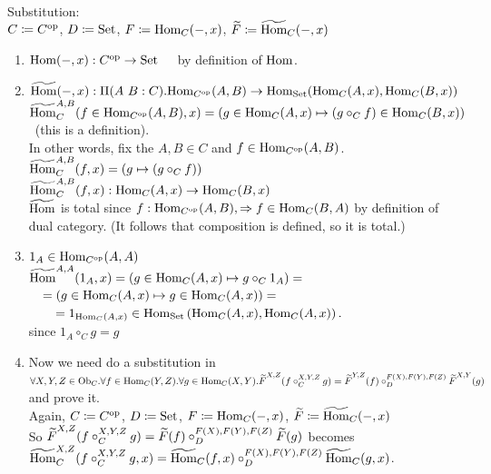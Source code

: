 \documentclass[10pt,a4paper]{article}
\begin{document}
\myprf\\
Substitution:\\
$C \coloneqq C^{\textrm{op}}$, 
$D \coloneqq {\textrm{Set}}$, 
$F \coloneqq {\textrm{Hom}}_C(-,x)$, 
${\widetilde{F}\textrm{}} \coloneqq {\widetilde{{\textrm{Hom}}}\textrm{}}_C(-,x)$\\
\begin{enumerate}
\item ${\textrm{Hom}}(-, x) : C^{\textrm{op}} \to {\textrm{Set}}$\ \ \ by definition of ${\textrm{Hom}}$.
\item $\HomMor(-, x) :\Pi(A\ B:C).\Hom_{C^\op}(A,B) \to \Hom_\Set(\Hom_C(A,x), \Hom_C(B,x))$\\
${\widetilde{{\textrm{Hom}}}\textrm{}}_C^{A,B}(f\in{\textrm{Hom}}_{C^{\textrm{op}}}(A,B), x) = (g \in{\textrm{Hom}}_C(A,x) \mapsto (g \circ_C f) \in{\textrm{Hom}}_C(B,x))$\ (this is a definition).\\
In other words, fix the $A,B\in C$ and $f\in{\textrm{Hom}}_{C^{\textrm{op}}}(A,B)$.\\
${\widetilde{{\textrm{Hom}}}\textrm{}}_C^{A,B}(f, x) = (g\mapsto (g \circ_C f))$\\
${\widetilde{{\textrm{Hom}}}\textrm{}}_C^{A,B}(f, x) : {\textrm{Hom}}_C(A,x) \to {\textrm{Hom}}_C(B,x)$
\\
${\widetilde{{\textrm{Hom}}}\textrm{}}$ is total since $f:{\textrm{Hom}}_{C^{\textrm{op}}}(A,B), \Rightarrow f\in{\textrm{Hom}}_C(B,A)$ by definition of dual category. (It follows that composition is defined, so it is total.)
\item $1_A\in{\textrm{Hom}}_{C^{\textrm{op}}}(A,A)$\\
${\widetilde{{\textrm{Hom}}}\textrm{}}^{A,A}(1_A, x) = \left(g \in{\textrm{Hom}}_C(A,x)\mapsto g \circ_C 1_A\right) = $\\
$\quad = \left(g \in{\textrm{Hom}}_C(A,x) \mapsto g \in{\textrm{Hom}}_C(A,x)\right) =$\\
$\quad \quad = 1_{{\textrm{Hom}}_C(A,x)} \in {\textrm{Hom}}_{\textrm{Set}}\left({\textrm{Hom}}_C(A,x), {\textrm{Hom}}_C(A,x)\right).$\\
since $1_A \circ_C g = g$\\
\item Now we need do a substitution in
$\forall X,Y,Z \in {\textrm{Ob}}_C.\forall f\in{\textrm{Hom}}_C(Y,Z).\forall g\in{\textrm{Hom}}_C(X,Y). {\widetilde{F}\textrm{}}^{X,Z}(f\circ_C^{X,Y,Z} g)={\widetilde{F}\textrm{}}^{Y,Z}(f)\circ_D^{F(X),F(Y),F(Z)} {\widetilde{F}\textrm{}}^{X,Y}(g)$ and prove it.\\
Again, $C \coloneqq C^{\textrm{op}}$, 
$D \coloneqq {\textrm{Set}}$, 
$F \coloneqq {\textrm{Hom}}_C(-,x)$, 
${\widetilde{F}\textrm{}} \coloneqq {\widetilde{{\textrm{Hom}}}\textrm{}}_C(-,x)$\\
So ${\widetilde{F}\textrm{}}^{X,Z}(f\circ_C^{X,Y,Z} g)={\widetilde{F}\textrm{}}(f)\circ_D^{F(X),F(Y),F(Z)} {\widetilde{F}\textrm{}}(g)$ becomes\\
${\widetilde{{\textrm{Hom}}}\textrm{}}_C^{X,Z}(f\circ_C^{X,Y,Z} g, x)={\widetilde{{\textrm{Hom}}}\textrm{}}_C(f,x)\circ_D^{F(X),F(Y),F(Z)} {\widetilde{{\textrm{Hom}}}\textrm{}}_C(g,x)$.\\

\end{enumerate}
\end{document}
